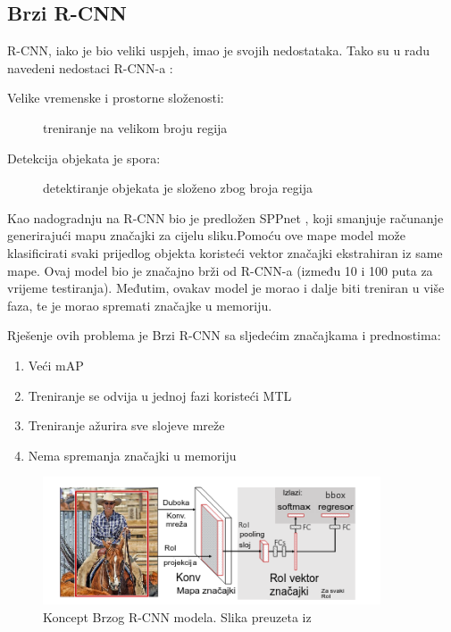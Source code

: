 \subsection{Brzi R-CNN}
R-CNN, iako je bio veliki uspjeh, imao je svojih nedostataka.
Tako su u radu \cite{DBLP:journals/corr/Girshick15} navedeni nedostaci R-CNN-a : 
\begin{description}
    \item [Velike vremenske i prostorne složenosti:]treniranje na velikom broju regija
    \item [Detekcija objekata je spora:]detektiranje objekata je složeno zbog broja regija
\end{description}
Kao nadogradnju na R-CNN bio je predložen SPPnet , koji smanjuje 
računanje generirajući mapu značajki za cijelu sliku.\newline Pomoću ove mape model može klasificirati svaki prijedlog objekta
koristeći vektor značajki ekstrahiran iz same mape.
Ovaj model bio je značajno brži od R-CNN-a (između 10 i 100 puta za vrijeme testiranja). Međutim, ovakav model je morao 
i dalje biti treniran u više faza, te je morao spremati značajke u memoriju.\newline

Rješenje ovih problema je Brzi R-CNN sa sljedećim značajkama i prednostima:
\begin{enumerate}
    \item Veći mAP 
    \item Treniranje se odvija u jednoj fazi koristeći MTL 
    \item Treniranje ažurira sve slojeve mreže
    \item Nema spremanja značajki u memoriju
\end{enumerate}

\begin{figure}[htb]
    \centering
    \includegraphics[width=10cm]{img/Fast-RCNN.png}
    \caption{Koncept Brzog R-CNN modela. Slika preuzeta iz \citep{DBLP:journals/corr/Girshick15}}
    \label{fig:Koncept Brzog R-CNN modela}
\end{figure}

